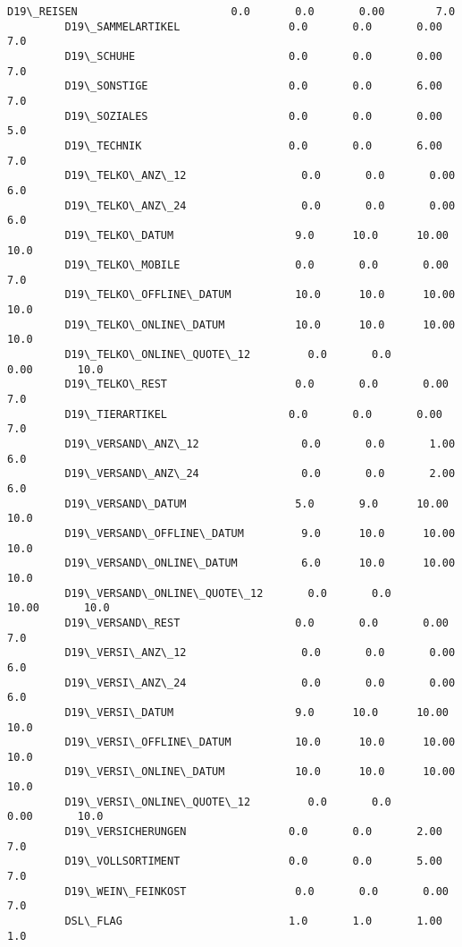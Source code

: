 \documentclass[11pt]{article}
\begin{document}
\begin{Verbatim}[commandchars=\\\{\}]
         D19\_REISEN                        0.0       0.0       0.00        7.0  
         D19\_SAMMELARTIKEL                 0.0       0.0       0.00        7.0  
         D19\_SCHUHE                        0.0       0.0       0.00        7.0  
         D19\_SONSTIGE                      0.0       0.0       6.00        7.0  
         D19\_SOZIALES                      0.0       0.0       0.00        5.0  
         D19\_TECHNIK                       0.0       0.0       6.00        7.0  
         D19\_TELKO\_ANZ\_12                  0.0       0.0       0.00        6.0  
         D19\_TELKO\_ANZ\_24                  0.0       0.0       0.00        6.0  
         D19\_TELKO\_DATUM                   9.0      10.0      10.00       10.0  
         D19\_TELKO\_MOBILE                  0.0       0.0       0.00        7.0  
         D19\_TELKO\_OFFLINE\_DATUM          10.0      10.0      10.00       10.0  
         D19\_TELKO\_ONLINE\_DATUM           10.0      10.0      10.00       10.0  
         D19\_TELKO\_ONLINE\_QUOTE\_12         0.0       0.0       0.00       10.0  
         D19\_TELKO\_REST                    0.0       0.0       0.00        7.0  
         D19\_TIERARTIKEL                   0.0       0.0       0.00        7.0  
         D19\_VERSAND\_ANZ\_12                0.0       0.0       1.00        6.0  
         D19\_VERSAND\_ANZ\_24                0.0       0.0       2.00        6.0  
         D19\_VERSAND\_DATUM                 5.0       9.0      10.00       10.0  
         D19\_VERSAND\_OFFLINE\_DATUM         9.0      10.0      10.00       10.0  
         D19\_VERSAND\_ONLINE\_DATUM          6.0      10.0      10.00       10.0  
         D19\_VERSAND\_ONLINE\_QUOTE\_12       0.0       0.0      10.00       10.0  
         D19\_VERSAND\_REST                  0.0       0.0       0.00        7.0  
         D19\_VERSI\_ANZ\_12                  0.0       0.0       0.00        6.0  
         D19\_VERSI\_ANZ\_24                  0.0       0.0       0.00        6.0  
         D19\_VERSI\_DATUM                   9.0      10.0      10.00       10.0  
         D19\_VERSI\_OFFLINE\_DATUM          10.0      10.0      10.00       10.0  
         D19\_VERSI\_ONLINE\_DATUM           10.0      10.0      10.00       10.0  
         D19\_VERSI\_ONLINE\_QUOTE\_12         0.0       0.0       0.00       10.0  
         D19\_VERSICHERUNGEN                0.0       0.0       2.00        7.0  
         D19\_VOLLSORTIMENT                 0.0       0.0       5.00        7.0  
         D19\_WEIN\_FEINKOST                 0.0       0.0       0.00        7.0  
         DSL\_FLAG                          1.0       1.0       1.00        1.0  

\end{Verbatim}
\end{document}
